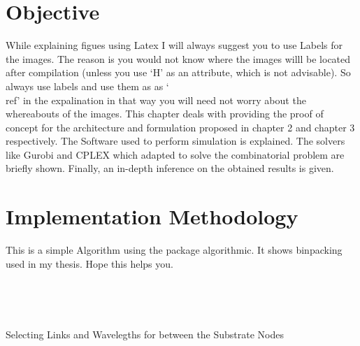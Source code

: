 \section{Objective}
While explaining figues using Latex I will always suggest you to use Labels for the images. The reason is you would not know where the images willl be located after compilation (unless you use `H' as an attribute, which is not advisable). So always use labels and use them as as `\\ref'  in the expalination in that way you will need not worry about the whereabouts of the images.
This chapter deals with providing the proof of concept for the architecture and formulation proposed in chapter 2 and chapter 3 respectively.  The Software used to perform simulation is explained. The solvers like Gurobi and CPLEX which adapted to solve the combinatorial problem are briefly shown. Finally, an in-depth inference on the obtained results is given. \par

\section{Implementation Methodology}

This is a simple Algorithm using the package algorithmic. It shows binpacking used in my thesis.
Hope this helps you.



\begin{algorithm}

\\

\\
\caption{Selecting Links and Wavelegths for between the Substrate Nodes}
\label{algo:one}
\end{algorithm} 



